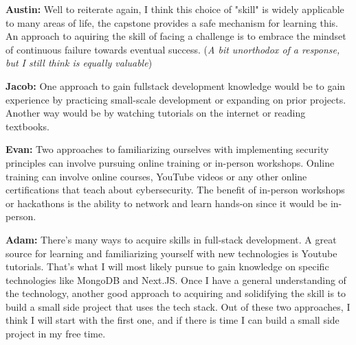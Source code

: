 \documentclass[12pt]{article}
\begin{document}
\begin{enumerate}
  \textbf{Austin: } Well to reiterate again, I think this choice of "skill" is widely applicable to many areas of life, the capstone provides a safe mechanism for learning this. An approach to aquiring the skill of facing a challenge is to embrace the mindset of continuous failure towards eventual success. (\textit{A bit unorthodox of a response, but I still think is equally valuable})
  
  \textbf{Jacob: } One approach to gain fullstack development knowledge would be to gain experience by practicing small-scale development or expanding on prior projects. Another way would be by watching tutorials on the internet or reading textbooks.
  
  \textbf{Evan: } Two approaches to familiarizing ourselves with implementing security principles can involve pursuing online training or in-person workshops. Online training can involve online courses, YouTube videos or any other online certifications that teach about cybersecurity. The benefit of in-person workshops or hackathons is the ability to network and learn hands-on since it would be in-person.

  \textbf{Adam:} There's many ways to acquire skills in full-stack development. A great source for learning and familiarizing yourself with new technologies is Youtube tutorials. That's what I will most likely pursue to gain knowledge on specific technologies like MongoDB and Next.JS. Once I have a general understanding of the technology, another good approach to acquiring and solidifying the skill is to build a small side project that uses the tech stack. Out of these two approaches, I think I will start with the first one, and if there is time I can build a small side project in my free time.
\end{enumerate}

\newpage
\end{document}
